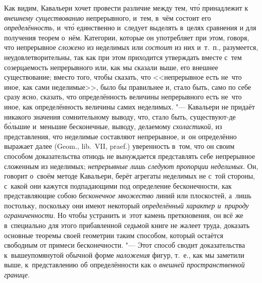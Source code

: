 Как видим, Кавальери хочет провести различие между тем, чт\'{о} принадлежит к
{\em внешнему существованию} непрерывного, и~тем, в~чём состоит его
{\em определённость,} и~чт\'{о} единственно и~следует выделять в~целях сравнения и
для получения теорем о~нём. Категории, которые он употребляет при этом, говоря,
что непрерывное {\em сложено} из неделимых или {\em состоит} из них и~т.~п.,
разумеется, неудовлетворительны, так как при этом приходится утверждать вместе
с~тем созерцаемость непрерывного или, как мы сказали выше, его внешнее
существование; вместо того, чтобы сказать, что <<непрерывное есть не~что иное,
как сами неделимые>>, было бы правильнее и, стало быть, само по себе сразу
ясно, сказать, что определённость величины непрерывного есть не~что иное, как
определённость величины самих неделимых. "--- Кавальери не придаёт никакого
значения сомнительному выводу, что, стало быть, существуют-де б\'{о}льшие и~меньшие
бесконечные, выводу, делаемому {\em схоластикой,} из представления, что неделимые
составляют непрерывное, и~он определённо выражает далее (Geom., lib.~VII,
praef.) уверенность в~том, что он своим способом доказательства отнюдь не
вынуждается представлять себе непрерывное сложенным из неделимых;
{\em непрерывные лишь следуют пропорции неделимых}. Он, говорит о~своём методе
Кавальери, берёт агрегаты неделимых не с~той стороны, с~какой они кажутся
подпадающими под определение бесконечности, как представляющие собою
{\em бесконечное множество} линий или плоскостей, а~лишь постольку, поскольку
они имеют некоторый {\em определённый характер и~природу ограниченности}. Но
чтобы устранить и~этот камень преткновения, он всё же в~специально для этого
прибавленной седьмой книге не жалеет труда, доказать основные теоремы своей
геометрии таким способом, который остаётся свободным от примеси бесконечности.
"--- Этот способ сводит доказательства к~вышеупомянутой обычной форме
{\em наложения} фигур, т.~е., как мы заметили выше, к~представлению об
определённости как о {\em внешней пространственной границе}.

